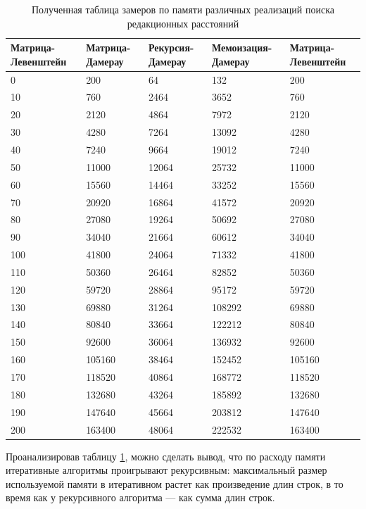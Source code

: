 \begin{table}[!ht]
    \centering
    \small
    \caption{Полученная таблица замеров по памяти различных реализаций поиска редакционных расстояний}
    \label{t:memory}
    \begin{tabular}{|l|l|l|l|l|}
    \hline
        Матрица-Левенштейн & Матрица-Дамерау & Рекурсия-Дамерау & Мемоизация-Дамерау & Матрица-Левенштейн \\ \hline
        0 & 200 & 64 & 132 & 200 \\ \hline
        10 & 760 & 2464 & 3652 & 760 \\ \hline
        20 & 2120 & 4864 & 7972 & 2120 \\ \hline
        30 & 4280 & 7264 & 13092 & 4280 \\ \hline
        40 & 7240 & 9664 & 19012 & 7240 \\ \hline
        50 & 11000 & 12064 & 25732 & 11000 \\ \hline
        60 & 15560 & 14464 & 33252 & 15560 \\ \hline
        70 & 20920 & 16864 & 41572 & 20920 \\ \hline
        80 & 27080 & 19264 & 50692 & 27080 \\ \hline
        90 & 34040 & 21664 & 60612 & 34040 \\ \hline
        100 & 41800 & 24064 & 71332 & 41800 \\ \hline
        110 & 50360 & 26464 & 82852 & 50360 \\ \hline
        120 & 59720 & 28864 & 95172 & 59720 \\ \hline
        130 & 69880 & 31264 & 108292 & 69880 \\ \hline
        140 & 80840 & 33664 & 122212 & 80840 \\ \hline
        150 & 92600 & 36064 & 136932 & 92600 \\ \hline
        160 & 105160 & 38464 & 152452 & 105160 \\ \hline
        170 & 118520 & 40864 & 168772 & 118520 \\ \hline
        180 & 132680 & 43264 & 185892 & 132680 \\ \hline
        190 & 147640 & 45664 & 203812 & 147640 \\ \hline
        200 & 163400 & 48064 & 222532 & 163400 \\ \hline
    \end{tabular}
\end{table}

Проанализировав таблицу \ref{t:memory}, можно сделать вывод, что по расходу памяти итеративные алгоритмы 
проигрывают рекурсивным: максимальный размер используемой памяти в итеративном растет как произведение длин строк,
в то время как у рекурсивного алгоритма — как сумма длин строк.

